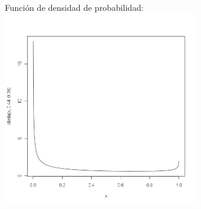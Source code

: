 \begin{itemize}
	Funci\'on de densidad de probabilidad:\\
  	  \includegraphics[width=3.3in,height=3.3in]{images/2_4-dbeta.png}


\end{itemize}
